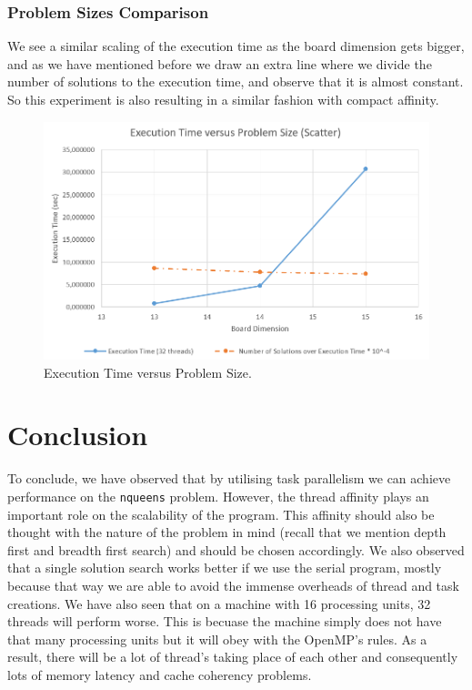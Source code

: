 \documentclass[11pt,reqno]{amsart}
\newcommand{\code}[1]{\texttt{#1}}
\begin{document}
\subsubsection{Problem Sizes Comparison}

We see a similar scaling of the execution time as the board dimension gets bigger, and as we have mentioned before we draw an extra line where we divide the number of solutions to the execution time, and observe that it is almost constant. So this experiment is also resulting in a similar fashion with compact affinity.
\begin{figure}[h]
\centering
\includegraphics[width=0.75\linewidth]{problem_size_scatter.png}
\caption{Execution Time versus Problem Size.}
\label{fig:size_s}
\end{figure}

\section{Conclusion}
To conclude, we have observed that by utilising task parallelism we can achieve performance on the \code{nqueens} problem. However, the thread affinity plays an important role on the scalability of the program. This affinity should also be thought with the nature of the problem in mind (recall that we mention depth first and breadth first search) and should be chosen accordingly. We also observed that a single solution search works better if we use the serial program, mostly because that way we are able to avoid the immense overheads of thread and task creations. 
We have also seen that on a machine with 16 processing units, 32 threads will perform worse. This is becuase the machine simply does not have that many processing units but it will obey with the OpenMP's rules. As a result, there will be a lot of thread's taking place of each other and consequently lots of memory latency and cache coherency problems.
\end{document}
